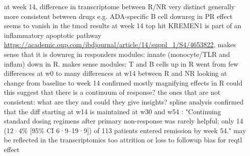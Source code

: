 \begin{outline}
\1 at week 14, difference in transcriptome between R/NR very distinct
    \2 generally more consistent between drugs
        \3 e.g. ADA-specific B cell downreg in PR effect seems to vanish in the tmod results at week 14
    \2 top hit KREMEN1 is part of an inflammatory apoptotic pathway \url{https://academic.oup.com/ibdjournal/article/14/suppl_1/S4/4653822}, makes sense that it is downreg in responders
    \2 modules: innate (monocyte/TLR and inflam) down in R. makes sense
    \2 modules: T and B cells up in R 
\1 went from few differences at w0 to many differences at w14 between R and NR
    \2 looking at change from baseline to week 14 confirmed mostly magnifying effects in R
        \3 could this suggest that there is a continuum of response?
    \2 the ones that are not consistent: what are they and could they give insights?
    \2 spline analysis confirmed that the diff starting at w14 is maintained at w30 and w54
    \2 \autocite{kennedy2019PredictorsAntiTNFTreatment}: "Continuing standard dosing regimens after primary non-response was rarely helpful; only 14 (12·4\% [95\% CI 6·9–19·9]) of 113 patients entered remission by week 54."
        \3 may be reflected in the transcriptomics too
    \2 attrition or loss to followup bias for reqtl effect




\end{outline}

